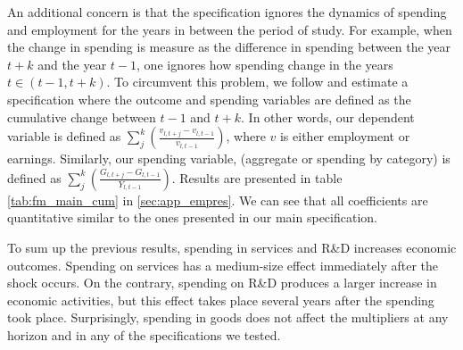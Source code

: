 \documentclass[dv_diss_main.tex]{subfiles}
\begin{document}
An additional concern is that the specification ignores the dynamics of spending and employment for the years in between the period of study. For example, when the change in spending is measure as the difference in spending between the year $t+k$ and the year $t-1$, one ignores how spending change in the years $t\in(t-1,t+k)$. To circumvent this problem, we follow \cite{ramey2018government} and estimate a specification where the outcome and spending variables are defined as the cumulative change between $t-1$ and $t+k$. In other words, our dependent variable is defined as $\sum_{j}^{k}(\frac{v_{l,t+j}-v_{l,t-1}}{v_{l,t-1}})$, where $v$ is either employment or earnings. Similarly, our spending variable, (aggregate or spending by category) is defined as $\sum_{j}^{k}(\frac{G_{l,t+j}-G_{l,t-1}}{Y_{l,t-1}})$. Results are presented in table \ref{tab:fm_main_cum} in \ref{sec:app_empres}. We can see that all coefficients are quantitative similar to the ones presented in our main specification. 

\iffalse
Another valid concern is the timing of actual spending. In the data, we observe the start and end date of the contract. In the regressions presented in sub-section \ref{subsec:emp_fm}, we use the year in which a contract has been signed to allocate the spending, and not the years in which the disbursements actually occur. To alleviate this source of spending mismeasurement, we follow \cite{Auerbach2020} and we construct a flow spending measure for each contract by allocating the value of a contract equally over its duration. The results for both the earnings and employment multipliers are reported in Table \ref{tab:fm_smooth} in \ref{sec:app_empres}. ???????????????
\fi

To sum up the previous results, spending in services and R\&D increases economic outcomes. Spending on services has a medium-size effect immediately after the shock occurs. On the contrary, spending on R\&D produces a larger increase in economic activities, but this effect takes place several years after the spending took place. Surprisingly, spending in goods does not affect the multipliers at any horizon and in any of the specifications we tested.


\end{document}
